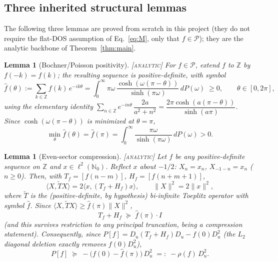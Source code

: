 \documentclass[11pt]{article}
\newtheorem{lemma}[theorem]{Lemma}
\newcommand{\PP}{\mathcal{P}}
\begin{document}
\subsection{Three inherited structural lemmas}

The following three lemmas are proved from scratch in this project (they do
not require the flat-DOS assumption of Eq.~\eqref{eq:M}, only that $f\in\PP$);
they are the analytic backbone of Theorem~\ref{thm:main}.

\begin{lemma}[Bochner/Poisson positivity]\label{lem:bochner}
\textup{\textsc{[analytic]}} For $f\in\PP$, extend $f$ to $\mathbb Z$ by
$f(-k)=f(k)$; the resulting sequence is positive-definite, with symbol
\begin{equation}
 \hat f(\theta):=\sum_{k\in\mathbb Z} f(k)\,e^{-ik\theta}
 =\int_0^\infty \pi\omega\,\frac{\cosh(\omega(\pi-\theta))}{\sinh(\pi\omega)}\,dP(\omega)\;\ge0,
 \qquad \theta\in[0,2\pi],
\end{equation}
using the elementary identity
$\sum_{n\in\mathbb Z}e^{-in\theta}\,\dfrac{2a}{a^2+n^2}=\dfrac{2\pi\cosh(a(\pi-\theta))}{\sinh(a\pi)}$.
Since $\cosh(\omega(\pi-\theta))$ is minimized at $\theta=\pi$,
\begin{equation}
 \min_\theta \hat f(\theta)=\hat f(\pi)=\int_0^\infty \frac{\pi\omega}{\sinh(\pi\omega)}\,dP(\omega)>0.
\end{equation}
\end{lemma}

\begin{lemma}[Even-sector compression]\label{lem:evensector}
\textup{\textsc{[analytic]}} Let $f$ be any positive-definite sequence on
$\mathbb Z$ and $x\in\ell^2(\mathbb N_0)$. Reflect $x$ about $-1/2$:
$X_n=x_n$, $X_{-1-n}=x_n$ ($n\ge0$). Then, with
$T_f=[f(n-m)]$, $H_f=[f(n+m+1)]$,
\begin{equation}
 \langle X,\tilde T X\rangle = 2\langle x,(T_f+H_f)x\rangle,\qquad \|X\|^2=2\|x\|^2,
\end{equation}
where $\tilde T$ is the (positive-definite, by hypothesis) bi-infinite
Toeplitz operator with symbol $\hat f$. Since $\langle X,\tilde TX\rangle\ge
\hat f(\pi)\|X\|^2$,
\begin{equation}
 T_f+H_f \;\succeq\; \hat f(\pi)\cdot I
\end{equation}
(and this survives restriction to any principal truncation, being a
compression statement). Consequently, since $P[f]=D_u(T_f+H_f)D_u-f(0)D_u^2$
(the $L_2$ diagonal deletion exactly removes $f(0)D_u^2$),
\begin{equation}
 P[f]\;\succeq\; -\big(f(0)-\hat f(\pi)\big)\,D_u^2 \;=:\; -\rho(f)\,D_u^2. \tag{Corollary 2.1}
\end{equation}
\end{lemma}
\end{document}
